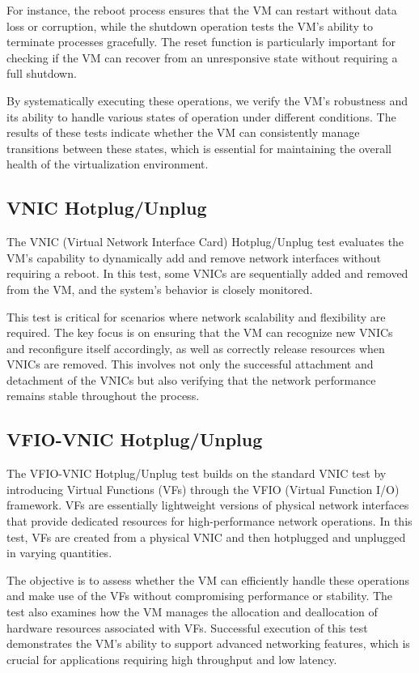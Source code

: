 For instance, the reboot process ensures that the VM can restart without data loss or corruption, while the shutdown operation tests the VM’s ability to terminate processes gracefully. The reset function is particularly important for checking if the VM can recover from an unresponsive state without requiring a full shutdown. \mynewline

By systematically executing these operations, we verify the VM’s robustness and its ability to handle various states of operation under different conditions. The results of these tests indicate whether the VM can consistently manage transitions between these states, which is essential for maintaining the overall health of the virtualization environment.

\subsection{VNIC Hotplug/Unplug}
The VNIC (Virtual Network Interface Card) Hotplug/Unplug test evaluates the VM's capability to dynamically add and remove network interfaces without requiring a reboot. In this test, some VNICs are sequentially added and removed from the VM, and the system’s behavior is closely monitored. \mynewline

This test is critical for scenarios where network scalability and flexibility are required. The key focus is on ensuring that the VM can recognize new VNICs and reconfigure itself accordingly, as well as correctly release resources when VNICs are removed. This involves not only the successful attachment and detachment of the VNICs but also verifying that the network performance remains stable throughout the process.

\subsection{VFIO-VNIC Hotplug/Unplug}
The VFIO-VNIC Hotplug/Unplug test builds on the standard VNIC test by introducing Virtual Functions (VFs) through the VFIO (Virtual Function I/O) framework. VFs are essentially lightweight versions of physical network interfaces that provide dedicated resources for high-performance network operations. In this test, VFs are created from a physical VNIC and then hotplugged and unplugged in varying quantities.\mynewline

The objective is to assess whether the VM can efficiently handle these operations and make use of the VFs without compromising performance or stability. The test also examines how the VM manages the allocation and deallocation of hardware resources associated with VFs. Successful execution of this test demonstrates the VM’s ability to support advanced networking features, which is crucial for applications requiring high throughput and low latency.

